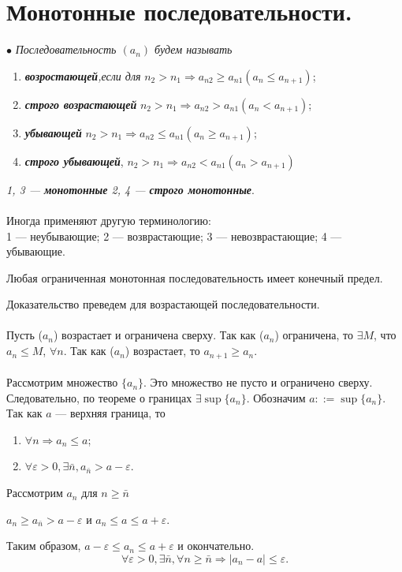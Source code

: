 \section{Монотонные последовательности.}
$\bullet$ \textit{Последовательность $(a_n)$ будем называть}
\begin{enumerate}
	\item \textit{\textbf{возростающей},если для} $n_2>n_1\Rightarrow a_{n2}\geqslant a_{n1}(a_n\leqslant a_{n+1})$;
	\item \textit{\textbf{строго возрастающей}} $n_2>n_1\Rightarrow a_{n2} > a_{n1}(a_n < a_{n+1})$;
	\item \textit{\textbf{убывающей}} $n_2>n_1\Rightarrow a_{n2} \leqslant a_{n1}(a_n\geqslant a_{n+1})$;
	\item \textit{\textbf{строго убывающей}}, $n_2>n_1\Rightarrow  a_{n2} < a_{n1}(a_n > a_{n+1})$
\end{enumerate}
\textit{1, 3 --- \textbf{монотонные} 2, 4 --- \textbf{строго монотонные}}.\\\\
Иногда применяют другую терминологию:\\
1 --- неубывающие; 2 --- возврастающие; 3 --- невозврастающие; 4 --- убывающие.
\begin{theorem} 
	Любая ограниченная монотонная последовательность имеет конечный предел.
\end{theorem}
\begin{Proof}
	Доказательство преведем для возрастающей последовательности.\\\\
	Пусть ($a_n$) возрастает и ограничена сверху. Так как ($a_n$) ограничена, то $\exists M$, что $a_n\leqslant M$, $\forall n$. Так как ($a_n$) возрастает, то $a_{n+1}\geqslant a_n$.\\\\
	Рассмотрим множество $\{a_n\}$. Это множество не пусто и ограничено сверху. Следовательно, по теореме о границах $\exists \sup \{a_n\}$.
	Обозначим $a::=\sup\{a_n\}$. Так как $a$ --- верхняя граница, то \begin{enumerate}
		\item $\forall n \Rightarrow a_n \leqslant a$;
		\item $\forall\varepsilon > 0,\exists \bar n, a_{ \bar n}> a - \varepsilon$.
	\end{enumerate}
	Рассмотрим $a_n$ для $n\geqslant \bar n$\begin{center}
		$a_n\geqslant a_{ \bar n}>a-\varepsilon$ и $a_n\leqslant a\leqslant a+\varepsilon$.
	\end{center}
	Таким образом, $a-\varepsilon\leqslant a_n\leqslant a+\varepsilon$ и окончательно.
	$$\forall\varepsilon >0,\exists\bar n ,\forall n \geqslant \bar n \Rightarrow |a_n - a|\leqslant\varepsilon.$$
\end{Proof}\\
